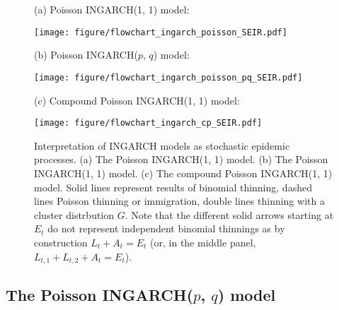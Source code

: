 \documentclass{article}
\begin{document}
\begin{figure}
\center
(a) Poisson INGARCH(1, 1) model:

\medskip

\medskip

\texttt{[image: figure/flowchart\_ingarch\_poisson\_SEIR.pdf]}

\vspace{1cm}


(b) Poisson INGARCH($p$, $q$) model:

\medskip
\texttt{[image: figure/flowchart\_ingarch\_poisson\_pq\_SEIR.pdf]}

\vspace{1cm}

(c) Compound Poisson INGARCH(1, 1) model:

\medskip

\medskip

\texttt{[image: figure/flowchart\_ingarch\_cp\_SEIR.pdf]}

\medskip

\medskip

\caption{Interpretation of INGARCH models as stochastic epidemic processes. (a) The Poisson INGARCH(1, 1) model. (b) The Poisson INGARCH(1, 1) model. (c) The compound Poisson INGARCH(1, 1) model. Solid lines represent results of binomial thinning, dashed lines Poisson thinning or immigration, double lines thinning with a cluster distrbution $G$. Note that the different solid arrows starting at $E_t$ do not represent independent binomial thinnings as by construction  $L_t + A_t = E_t$ (or, in the middle panel, $L_{t, 1} + L_{t, 2} + A_t = E_t$).}
\label{fig:ingarch_flowchart_poisson}
\end{figure}


\subsection{The Poisson INGARCH($p$, $q$) model}
\label{subsec:poissonpq}
\end{document}
